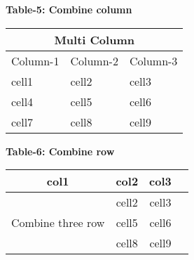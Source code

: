 \documentclass{article}
\begin{document}
\centering
\textbf{Table-5: Combine column}
\begin{center}

\begin{tabular}{ |m{2cm}||m{2cm}||m{2cm}| }

\hline
\multicolumn{3}{|c|}{Multi Column} \\

\hline
Column-1 &  Column-2 &  Column-3 \\

\hline
cell1 & cell2 & cell3 \\

cell4 & cell5 & cell6 \\

cell7 & cell8 & cell9 \\ 

\hline

\end{tabular}
\end{center}


\centering
\textbf{Table-6: Combine row}

\begin{center}
\begin{tabular}{ |c|c|c|c| }

\hline
col1 & col2 & col3 \\

\hline
\multirow{3}{4em}{Combine three row} & cell2 & cell3 \\

& cell5 & cell6 \\

& cell8 & cell9 \\

\hline

\end{tabular}
\end{center}
\end{document}
